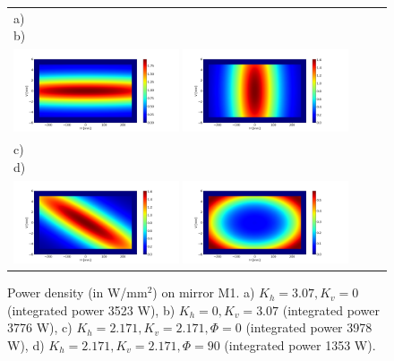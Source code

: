 \documentclass{iucr}              %
\begin{document}
\begin{figure} 
\label{fig:M1powerdensity}
\begin{center}
\begin{tabular}{l} 
   a)~~~~~~~~~~~~~~~~~~~~~~~~~~~~~~~~~~~~~~~~~~~~
   b)~~~~~~~~~~~~~~~~~~~~~~~~~~~~~~~~~~~~~~~~~~~~\\
   \includegraphics[width=0.45\textwidth]{figures/powerdensityKv.png}
   \includegraphics[width=0.45\textwidth]{figures/powerdensityKh.png}\\
   c)~~~~~~~~~~~~~~~~~~~~~~~~~~~~~~~~~~~~~~~~~~~~
   d)~~~~~~~~~~~~~~~~~~~~~~~~~~~~~~~~~~~~~~~~~~~~\\
   \includegraphics[width=0.45\textwidth]{figures/powerdensityKhKv.png} 
      \includegraphics[width=0.45\textwidth]{figures/powerdensityKhKv90.png}
\end{tabular}
\end{center}
\caption
{  Power density (in W/mm$^2$) on mirror M1.
a) $K_h=3.07, K_v=0$ (integrated power 3523 W),
b) $K_h=0,K_v=3.07$ (integrated power 3776 W),
c) $K_h=2.171,K_v=2.171, \Phi=0$ \textdegree (integrated power 3978 W),
d) $K_h=2.171,K_v=2.171, \Phi=90$ \textdegree (integrated power 1353 W).
}
\end{figure} 
\end{document}
